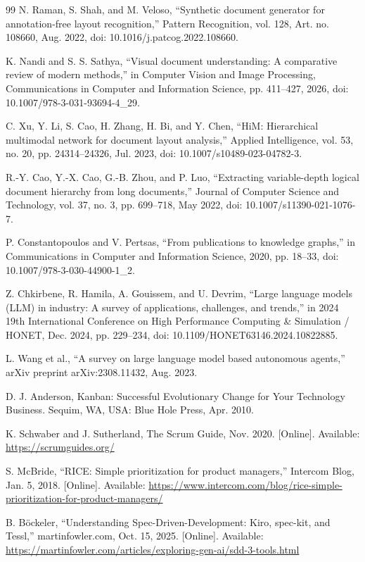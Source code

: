 \begin{thebibliography}{99}
   N. Raman, S. Shah, and M. Veloso, “Synthetic document generator for annotation-free layout recognition,” Pattern Recognition, vol. 128, Art. no. 108660, Aug. 2022, doi: 10.1016/j.patcog.2022.108660.

   K. Nandi and S. S. Sathya, “Visual document understanding: A comparative review of modern methods,” in Computer Vision and Image Processing, Communications in Computer and Information Science, pp. 411--427, 2026, doi: 10.1007/978-3-031-93694-4\_29.

   C. Xu, Y. Li, S. Cao, H. Zhang, H. Bi, and Y. Chen, “HiM: Hierarchical multimodal network for document layout analysis,” Applied Intelligence, vol. 53, no. 20, pp. 24314--24326, Jul. 2023, doi: 10.1007/s10489-023-04782-3.

   R.-Y. Cao, Y.-X. Cao, G.-B. Zhou, and P. Luo, “Extracting variable-depth logical document hierarchy from long documents,” Journal of Computer Science and Technology, vol. 37, no. 3, pp. 699--718, May 2022, doi: 10.1007/s11390-021-1076-7.

   P. Constantopoulos and V. Pertsas, “From publications to knowledge graphs,” in Communications in Computer and Information Science, 2020, pp. 18--33, doi: 10.1007/978-3-030-44900-1\_2.

   Z. Chkirbene, R. Hamila, A. Gouissem, and U. Devrim, “Large language models (LLM) in industry: A survey of applications, challenges, and trends,” in 2024 19th International Conference on High Performance Computing \& Simulation / HONET, Dec. 2024, pp. 229--234, doi: 10.1109/HONET63146.2024.10822885.

   L. Wang et al., “A survey on large language model based autonomous agents,” arXiv preprint arXiv:2308.11432, Aug. 2023.

   D. J. Anderson, Kanban: Successful Evolutionary Change for Your Technology Business. Sequim, WA, USA: Blue Hole Press, Apr. 2010.

   K. Schwaber and J. Sutherland, The Scrum Guide, Nov. 2020. [Online]. Available: \url{https://scrumguides.org/}

   S. McBride, “RICE: Simple prioritization for product managers,” Intercom Blog, Jan. 5, 2018. [Online]. Available: \url{https://www.intercom.com/blog/rice-simple-prioritization-for-product-managers/}

   B. Böckeler, “Understanding Spec-Driven-Development: Kiro, spec-kit, and Tessl,” martinfowler.com, Oct. 15, 2025. [Online]. Available: \url{https://martinfowler.com/articles/exploring-gen-ai/sdd-3-tools.html}


\end{thebibliography}
